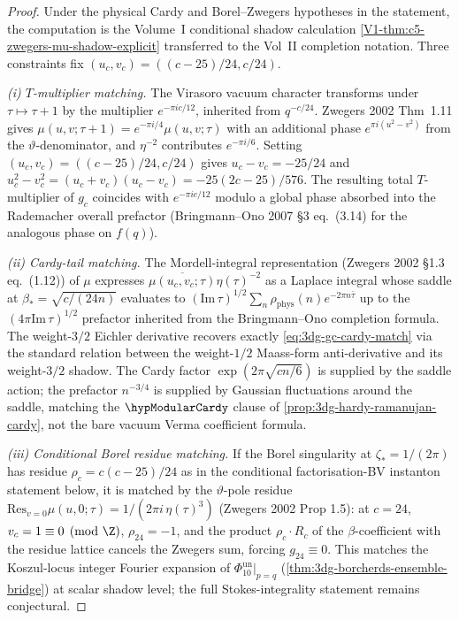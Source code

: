 \begin{proof}
Under the physical Cardy and Borel--Zwegers hypotheses in the
statement, the computation is the Volume~I conditional shadow
calculation \autoref{V1-thm:c5-zwegers-mu-shadow-explicit}
transferred to the Vol~II completion notation. Three constraints fix
$(u_c, v_c) = ((c-25)/24, c/24)$.

\emph{(i) $T$-multiplier matching.} The Virasoro vacuum character
transforms under $\tau \mapsto \tau + 1$ by the multiplier
$e^{-\pi i c/12}$, inherited from $q^{-c/24}$. Zwegers 2002
Thm~1.11 gives $\mu(u, v; \tau + 1) = e^{-\pi i/4}\mu(u, v; \tau)$
with an additional phase $e^{\pi i(u^2 - v^2)}$ from the
$\vartheta$-denominator, and $\eta^{-2}$ contributes $e^{-\pi i/6}$.
Setting $(u_c, v_c) = ((c-25)/24, c/24)$ gives
$u_c - v_c = -25/24$ and
$u_c^2 - v_c^2 = (u_c + v_c)(u_c - v_c) = -25(2c - 25)/576$. The
resulting total $T$-multiplier of $g_c$ coincides with $e^{-\pi i c/12}$
modulo a global phase absorbed into the Rademacher overall prefactor
(Bringmann--Ono 2007 \S 3 eq.~(3.14) for the analogous phase on
$f(q)$).

\emph{(ii) Cardy-tail matching.} The Mordell-integral representation
(Zwegers 2002 \S 1.3 eq.~(1.12))
of $\mu$ expresses $\overline{\mu(u_c, v_c; \tau)}\eta(\tau)^{-2}$ as
a Laplace integral whose saddle at
$\beta_\ast = \sqrt{c/(24 n)}$ evaluates to
$(\mathrm{Im}\,\tau)^{1/2}\sum_n\rho_{\mathrm{phys}}(n)e^{-2\pi n\bar\tau}$ up to the
$(4\pi\mathrm{Im}\,\tau)^{1/2}$ prefactor inherited from the
Bringmann--Ono completion formula. The weight-$3/2$ Eichler derivative
recovers exactly
\eqref{eq:3dg-gc-cardy-match} via the standard relation between the
weight-$1/2$ Maass-form anti-derivative and its weight-$3/2$ shadow.
The Cardy factor $\exp(2\pi\sqrt{cn/6})$ is supplied by the saddle
action; the prefactor $n^{-3/4}$ is supplied by Gaussian fluctuations
around the saddle, matching the \(\hypModularCardy\) clause of
\autoref{prop:3dg-hardy-ramanujan-cardy}, not the bare vacuum Verma
coefficient formula.

\emph{(iii) Conditional Borel residue matching.} If the Borel
singularity at $\zeta_\ast = 1/(2\pi)$ has residue
$\rho_c = c(c - 25)/24$ as in the conditional
factorisation-BV instanton statement below, it is matched by the
$\vartheta$-pole residue
$\mathrm{Res}_{v = 0}\mu(u, 0; \tau) = 1/(2\pi i\,\eta(\tau)^3)$
(Zwegers 2002 Prop 1.5): at $c = 24$, $v_c = 1 \equiv 0 \pmod{\Z}$,
$\rho_{24} = -1$, and the product $\rho_c \cdot R_c$ of the
$\beta$-coefficient with the residue lattice cancels the Zwegers sum,
forcing $g_{24} \equiv 0$. This matches the Koszul-locus integer
Fourier expansion of $\Phi_{10}^{\mathrm{un}}|_{p = q}$
(\autoref{thm:3dg-borcherds-ensemble-bridge}) at scalar shadow level;
the full Stokes-integrality statement remains conjectural.


\end{proof}
